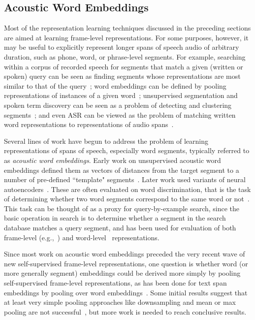 \subsection{Acoustic Word Embeddings}

Most of the representation learning techniques discussed in the preceding sections are aimed at learning frame-level representations. For some purposes, however, it may be useful to explicitly represent longer spans of speech audio of arbitrary duration, such as phone, word, or phrase-level segments.  For example, searching within a corpus of recorded speech for segments that match a given (written or spoken) query can be seen as finding segments whose representations are most similar to that of the query~\cite{levin_segmental_2015,chen_querybyexample_2015,chung_audio_2016,settle_querybyexample_2017}; word embeddings can be defined by pooling representations of instances of a given word~\cite{chung_speech2vec_2018}; unsupervised segmentation and spoken term discovery can be seen as a problem of detecting and clustering segments~\cite{kamper_embedded_2017,kamper_segmental_2017}; and even ASR can be viewed as the problem of matching written word representations to representations of audio spans~\cite{maas_wordlevel_2012,bengio_word_2014,settle_acoustically_2019}.  

Several lines of work have begun to address the problem of learning representations of spans of speech, especially word segments, typically referred to as \textit{acoustic word embeddings}.  Early work on unsupervised acoustic word embeddings defined them as vectors of distances from the target segment to a number of pre-defined ``template" segments~\cite{levin_fixed-dimensional_2013}. Later work used variants of neural autoencoders~\cite{chung_audio_2016,holzenberger_learning_2018,kamper_truly_2019,peng_correspondence_2020}. These are often evaluated on word discrimination, that is the task of determining whether two word segments correspond to the same word or not~\cite{carlin_rapid_2011}. This task can be thought of as a proxy for query-by-example search, since the basic operation in search is to determine whether a segment in the search database matches a query segment, and has been used for evaluation of both frame-level (e.g.,~\cite{kamper_unsupervised_2015}) and word-level~\cite{levin_fixed-dimensional_2013,kamper_deep_2016} representations.

Since most work on acoustic word embeddings preceded the very recent wave of new self-supervised frame-level representations, one question is whether word (or more generally segment) embeddings could be derived more simply by pooling self-supervised frame-level representations, as has been done for text span embeddings by pooling over word embeddings~\cite{toshniwal_crosstask_2020,wang_phrasebert_2021}. Some initial results suggest that at least very simple pooling approaches like downsampling and mean or max pooling are not successful~\cite{vanstaden_comparison_2021,peng_correspondence_2020}, but more work is needed to reach conclusive results.
